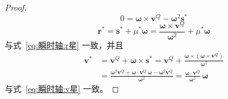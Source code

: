 \begin{proof}
    \begin{equation}
        0 = \bm{\omega}\times\mathbf{v}^{Q} - \bm{\omega}^2\mathbf{s}^*
    \end{equation}
    \begin{equation}
        \mathbf{r}^* = \mathbf{s}^* + \mu^*\bm{\omega} = \frac{\bm{\omega}\times\mathbf{v}^{Q}}{\bm{\omega}^2} + \mu^*\bm{\omega}
    \end{equation}
    与式~\eqref{eq:瞬时轴:r星} 一致，并且
    \begin{equation}
        \begin{aligned}
            \mathbf{v}^* &= \mathbf{v}^{Q} + \bm{\omega}\times\mathbf{s}^* = \mathbf{v}^{Q} + \frac{\bm{\omega}\times(\bm{\omega}\times\mathbf{v}^{Q})}{\bm{\omega}^2}\\
            &= \frac{\bm{\omega}^2\mathbf{v}^{Q} + \bm{\omega}\cdot\mathbf{v}^{Q}\,\bm{\omega} - \bm{\omega}^2\mathbf{v}^{Q}}{\bm{\omega}^2} = \frac{\bm{\omega}\cdot\mathbf{v}^{Q}}{\bm{\omega}^2}\,\bm{\omega}
        \end{aligned}
    \end{equation}
    与式~\eqref{eq:瞬时轴:v星} 一致。
\end{proof}

